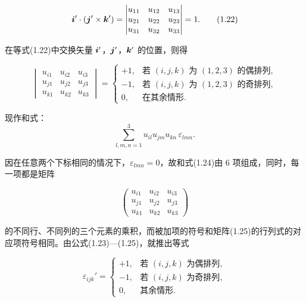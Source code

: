 \begin{equation}
\bm{i}' \cdot (\bm{j}' \times \bm{k}') =
\begin{vmatrix}
u_{11} & u_{12} & u_{13}\\
u_{21} & u_{22} & u_{23}\\
u_{31} & u_{32} & u_{33}
\end{vmatrix} = 1.
\tag{1.22}
\end{equation}

在等式(1.22)中交换矢量 $\bm{i}'$，$\bm{j}'$，$\bm{k}'$ 的位置，则得

\begin{equation}
\begin{vmatrix}
u_{i1} & u_{i2} & u_{i3}\\
u_{j1} & u_{j2} & u_{j3}\\
u_{k1} & u_{k2} & u_{k3}
\end{vmatrix} =
\begin{cases}
+1, & \text{若 } (i,j,k) \text{ 为 } (1,2,3) \text{ 的偶排列},\\
-1, & \text{若 } (i,j,k) \text{ 为 } (1,2,3) \text{ 的奇排列},\\
0,  & \text{在其余情形}.
\end{cases}
\tag{1.23}
\end{equation}

现作和式：
\begin{equation}
\sum_{l,m,n=1}^{3} u_{il} u_{jm} u_{kn}\, \varepsilon_{lmn}.
\tag{1.24}
\end{equation}

因在任意两个下标相同的情况下，$\varepsilon_{lmn} = 0$，故和式(1.24)由 6 项组成，同时，每一项都是矩阵

\begin{equation}
\begin{pmatrix}
u_{i1} & u_{i2} & u_{i3}\\
u_{j1} & u_{j2} & u_{j3}\\
u_{k1} & u_{k2} & u_{k3}
\end{pmatrix}
\tag{1.25}
\end{equation}

的不同行、不同列的三个元素的乘积，而被加项的符号和矩阵(1.25)的行列式的对应项符号相同。由公式(1.23)—(1.25)，就推出等式

\begin{equation*}
\varepsilon_{ijk}' =
\begin{cases}
+1, & \text{若 } (i,j,k) \text{ 为偶排列},\\
-1, & \text{若 } (i,j,k) \text{ 为奇排列},\\
0,  & \text{其余情形}.
\end{cases}
\end{equation*}

